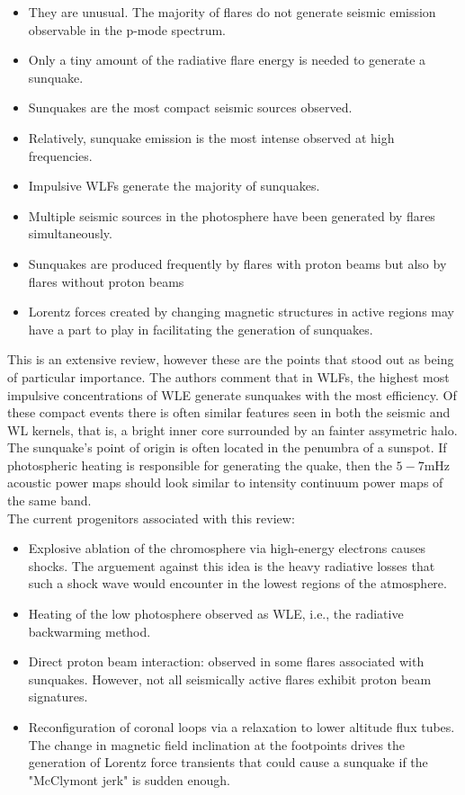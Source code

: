 \begin{itemize}
\item They are unusual. The majority of flares do not generate seismic emission observable in the p-mode spectrum.
\item Only a tiny amount of the radiative flare energy is needed to generate a sunquake.
\item Sunquakes are the most compact seismic sources observed.
\item Relatively, sunquake emission is the most intense observed at high frequencies.
\item Impulsive WLFs generate the majority of sunquakes. 
\item Multiple seismic sources in the photosphere have been generated by flares simultaneously.
\item Sunquakes are produced frequently by flares with proton beams but also by flares without proton beams
\item Lorentz forces created by changing magnetic structures in active regions may have a part to play in facilitating the generation of sunquakes.
\end{itemize}

This is an extensive review, however these are the points that stood out as being of particular importance. The authors comment that in WLFs, the highest most impulsive concentrations of WLE generate sunquakes with the most efficiency. Of these compact events there is often similar features seen in both the seismic and WL kernels, that is, a bright inner core surrounded by an fainter assymetric halo. The sunquake's point of origin is often located in the penumbra of a sunspot. If photospheric heating is responsible for generating the quake, then the $5-7$mHz acoustic power maps should look similar to intensity continuum power maps of the same band.\\
The current progenitors associated with this review:
\begin{itemize}
\item Explosive ablation of the chromosphere via high-energy electrons causes shocks. The arguement against this idea is the heavy radiative losses that such a shock wave would encounter in the lowest regions of the atmosphere.  
\item Heating of the low photosphere observed as WLE, i.e., the radiative backwarming method.
\item Direct proton beam interaction: observed in some flares associated with sunquakes. However, not all seismically active flares exhibit proton beam signatures. 
\item Reconfiguration of coronal loops via a relaxation to lower altitude flux tubes. The change in magnetic field inclination at the footpoints drives the generation of Lorentz force transients that could cause a sunquake if the "McClymont jerk" is sudden enough.
\end{itemize}




